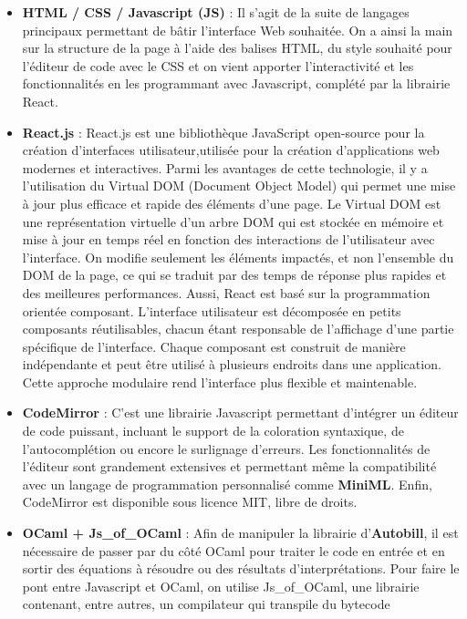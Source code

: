 \documentclass[
  12pt,
]{article}
\begin{document}
\begin{itemize}
\item
  \textbf{HTML / CSS / Javascript (JS)} : Il s'agit de la suite de
  langages principaux permettant de bâtir l'interface Web souhaitée. On
  a ainsi la main sur la structure de la page à l'aide des balises HTML,
  du style souhaité pour l'éditeur de code avec le CSS et on vient
  apporter l'interactivité et les fonctionnalités en les programmant
  avec Javascript, complété par la librairie React.
\item
  \textbf{React.js} : React.js est une bibliothèque JavaScript
  open-source pour la création d'interfaces utilisateur,utilisée pour la
  création d'applications web modernes et interactives. Parmi les
  avantages de cette technologie, il y a l'utilisation du Virtual DOM
  (Document Object Model) qui permet une mise à jour plus efficace et
  rapide des éléments d'une page. Le Virtual DOM est une représentation
  virtuelle d'un arbre DOM qui est stockée en mémoire et mise à jour en
  temps réel en fonction des interactions de l'utilisateur avec
  l'interface. On modifie seulement les éléments impactés, et non
  l'ensemble du DOM de la page, ce qui se traduit par des temps de
  réponse plus rapides et des meilleures performances. Aussi, React est
  basé sur la programmation orientée composant. L'interface utilisateur
  est décomposée en petits composants réutilisables, chacun étant
  responsable de l'affichage d'une partie spécifique de l'interface.
  Chaque composant est construit de manière indépendante et peut être
  utilisé à plusieurs endroits dans une application. Cette approche
  modulaire rend l'interface plus flexible et maintenable.
\item
  \textbf{CodeMirror} : C'est une librairie Javascript permettant
  d'intégrer un éditeur de code puissant, incluant le support de la
  coloration syntaxique, de l'autocomplétion ou encore le surlignage
  d'erreurs. Les fonctionnalités de l'éditeur sont grandement extensives
  et permettant même la compatibilité avec un langage de programmation
  personnalisé comme \textbf{MiniML}. Enfin, CodeMirror est disponible
  sous licence MIT, libre de droits.
\item
  \textbf{OCaml + Js\_of\_OCaml} : Afin de manipuler la librairie
  d'\textbf{Autobill}, il est nécessaire de passer par du côté OCaml
  pour traiter le code en entrée et en sortir des équations à résoudre
  ou des résultats d'interprétations. Pour faire le pont entre
  Javascript et OCaml, on utilise Js\_of\_OCaml, une librairie
  contenant, entre autres, un compilateur qui transpile du bytecode

\end{itemize}
\end{document}
